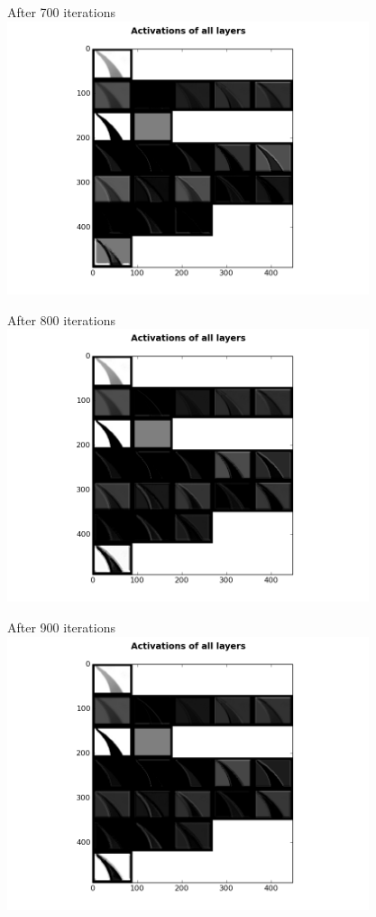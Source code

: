 \begin{frame}{After 700 iterations}
\includegraphics[height=8.0cm]{data/activations/output-700.png}\\ 
\end{frame}

\begin{frame}{After 800 iterations}
\includegraphics[height=8.0cm]{data/activations/output-800.png}\\ 
\end{frame}

\begin{frame}{After 900 iterations}
\includegraphics[height=8.0cm]{data/activations/output-900.png}\\ 
\end{frame}

